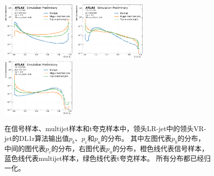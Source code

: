 \begin{figure}[h]
    \includegraphics[width=0.33\textwidth]{figuresXbb/samples/inputs_aux/dl1r_pb_1_norm.pdf}
    \includegraphics[width=0.33\textwidth]{figuresXbb/samples/inputs_aux/dl1r_pc_1_norm.pdf}
    \includegraphics[width=0.33\textwidth]{figuresXbb/samples/inputs_aux/dl1r_pu_1_norm.pdf}
  \caption{在信号样本、multijet样本和t夸克样本中，领头LR-jet中的领头VR-jet的DL1r算法输出值$p_b$、$p_c$和$p_u$的分布。
其中左图代表$p_b$的分布，中间的图代表$p_c$的分布，右图代表$p_u$的分布，橙色线代表信号样本，蓝色线代表multijet样本，绿色线代表t夸克样本。
所有分布都已经归一化。}
  \label{fig:DL1RLD}
\end{figure}

